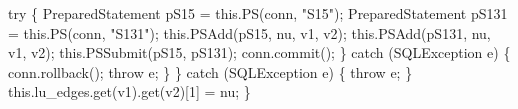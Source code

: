 \documentclass{article}
\def\nwendcode{\endtrivlist \endgroup}      %
\let\nwdocspar=\par
\theoremstyle{definition}                   %
\begin{document}
    try \{
      PreparedStatement pS15 = this.PS(conn, "S15");
      PreparedStatement pS131 = this.PS(conn, "S131");
      this.PSAdd(pS15, nu, v1, v2);
      this.PSAdd(pS131, nu, v1, v2);
      this.PSSubmit(pS15, pS131);
      conn.commit();
    \} catch (SQLException e) \{
      conn.rollback();
      throw e;
    \}
  \} catch (SQLException e) \{
    throw e;
  \}
  this.lu_edges.get(v1).get(v2)[1] = nu;
\}
\eatline
{}\nwendcode{}\nwdocspar
\end{document}
